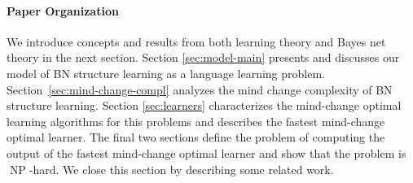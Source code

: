 \documentclass{elsarticle}%
\DeclareMathOperator{\NP}{\mathbf{\mathrm{NP}}}
\begin{document}

\paragraph{Paper Organization} We introduce concepts and results from both learning theory and Bayes net theory in the next section. Section \ref{sec:model-main} presents and discusses our model of BN structure learning 
as a language learning problem.
Section~\ref{sec:mind-change-compl} analyzes the mind change complexity of BN structure learning. Section \ref{sec:learners} characterizes the mind-change optimal learning algorithms for this problems and describes the fastest mind-change optimal learner. The final two sections define the problem of computing the output of the fastest mind-change optimal learner and show that the problem is $\NP$-hard. We close this section by describing some related work.
\end{document}
